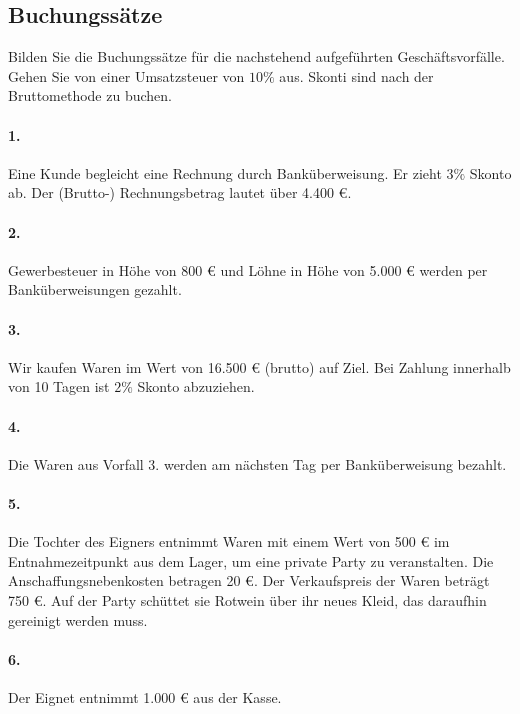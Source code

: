\documentclass[paper=a4, fontsize=11pt]{scrartcl}
\numberwithin{equation}{section}
\numberwithin{figure}{section}
\numberwithin{table}{section}
\begin{document}
{%
\subsection{Buchungssätze}
Bilden Sie die Buchungssätze für die nachstehend aufgeführten Geschäftsvorfälle. Gehen Sie von einer Umsatzsteuer von $10 \%$ aus. Skonti sind nach der Bruttomethode zu buchen. \\

\paragraph{1.}
Eine Kunde begleicht eine Rechnung durch Banküberweisung. Er zieht $3 \%$ Skonto ab. Der (Brutto-) Rechnungsbetrag lautet über 4.400 €. \\

\paragraph{2.}
Gewerbesteuer in Höhe von 800 € und Löhne in Höhe von 5.000 € werden per Banküberweisungen gezahlt. \\

\paragraph{3.}
Wir kaufen Waren im Wert von 16.500 € (brutto) auf Ziel. Bei Zahlung innerhalb von 10 Tagen ist $2 \%$ Skonto abzuziehen. \\

\paragraph{4.}
Die Waren aus Vorfall 3. werden am nächsten Tag per Banküberweisung bezahlt. \\

\paragraph{5.}
Die Tochter des Eigners entnimmt Waren mit einem Wert von 500 € im Entnahmezeitpunkt aus dem Lager, um eine private Party zu veranstalten. Die Anschaffungsnebenkosten betragen 20 €.  Der Verkaufspreis der Waren beträgt 750 €. Auf der Party schüttet sie Rotwein über ihr neues Kleid, das daraufhin gereinigt werden muss. \\

\paragraph{6.}
Der Eignet entnimmt 1.000 € aus der Kasse. \\

}
\end{document}
